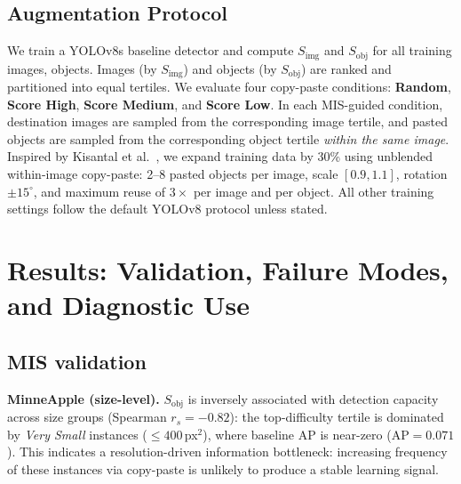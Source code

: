\documentclass[conference]{IEEEtran}
\begin{document}


\subsection{Augmentation Protocol}
We train a YOLOv8s baseline detector and compute $S_{\mathrm{img}}$ and $S_{\mathrm{obj}}$ for all training images, objects.
Images (by $S_{\mathrm{img}}$) and objects (by $S_{\mathrm{obj}}$) are ranked and partitioned into equal tertiles.
We evaluate four copy-paste conditions: \textbf{Random}, \textbf{Score High}, \textbf{Score Medium}, and \textbf{Score Low}.
In each MIS-guided condition, destination images are sampled from the corresponding image tertile, and pasted objects are sampled from the corresponding object tertile \emph{within the same image}.
Inspired by Kisantal et al.\ \cite{kisantal2019augmentation}, we expand training data by 30\% using unblended within-image copy-paste:
2--8 pasted objects per image, scale $[0.9,1.1]$, rotation $\pm15^\circ$, and maximum reuse of $3{\times}$ per image and per object.
All other training settings follow the default YOLOv8 protocol unless stated.


\section{Results: Validation, Failure Modes, and Diagnostic Use}
\subsection{MIS validation}
\textbf{MinneApple (size-level).}
$S_{\mathrm{obj}}$ is inversely associated with detection capacity across size groups (Spearman $r_s{=}{-}0.82$):
the top-difficulty tertile is dominated by \textit{Very Small} instances ($\le400$\,px$^2$), where baseline AP is near-zero (AP$=0.071$).
This indicates a resolution-driven information bottleneck: increasing frequency of these instances via copy-paste is unlikely to produce a stable learning signal.
\end{document}
